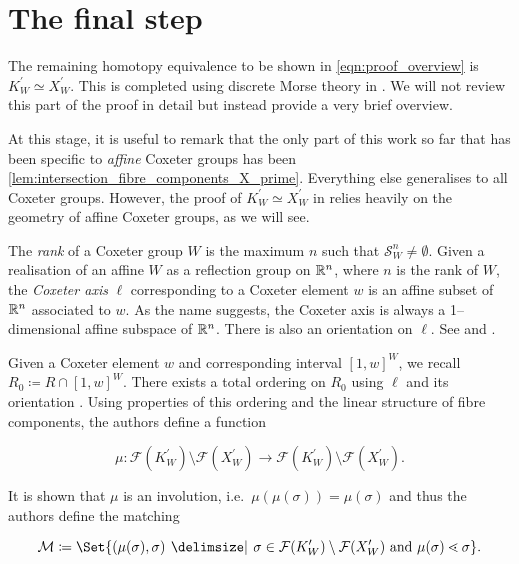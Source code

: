 \documentclass[class=article, crop=false]{standalone}
\begin{document}
\section{The final step}
The remaining homotopy equivalence to be shown in \eqref{eqn:proof_overview} is $K^\prime_W \simeq X^\prime_W$. This is completed using discrete Morse theory in \cite[Section 8]{paolini_salvetti_kpi1_2021}. We will not review this part of the proof in detail but instead provide a very brief overview.

At this stage, it is useful to remark that the only part of this work so far that has been specific to \emph{affine} Coxeter groups has been \cref{lem:intersection_fibre_components_X_prime}. Everything else generalises to all Coxeter groups. However, the proof of $K_W^\prime \simeq X^\prime_W$ in \cite{paolini_salvetti_kpi1_2021} relies heavily on the geometry of affine Coxeter groups, as we will see.

The \emph{rank} of a Coxeter group $W$ is the maximum $n$ such that $\mathcal{S}^n_W \neq \emptyset$. Given a realisation of an affine $W$ as a reflection group on $\mathbb{R}^n$, where $n$ is the rank of $W$, the \emph{Coxeter axis} $\ell$ corresponding to a Coxeter element $w$ is an affine subset of $\mathbb{R}^n$ associated to $w$. As the name suggests, the Coxeter axis is always a 1--dimensional affine subspace of $\mathbb{R}^n$. There is also an orientation on $\ell$. See \cite[Section 4]{paolini_salvetti_kpi1_2021} and \cite[Section 7]{mccammond_dual_2015}.

Given a Coxeter element $w$ and corresponding interval $[1,w]^W$, we recall $R_0 \coloneq R \cap [1,w]^W$. There exists a total ordering on $R_0$ using $\ell$ and its orientation \cite[Definition 4.10]{paolini_salvetti_kpi1_2021}. Using properties of this ordering and the linear structure of fibre components, the authors define a function 

\begin{equation*}
    \mu \colon \mathcal{F}(K_W^\prime)\setminus\mathcal{F}(X_W^\prime) \to \mathcal{F}(K_W^\prime)\setminus\mathcal{F}(X_W^\prime) .
\end{equation*}

It is shown that $\mu$ is an involution, i.e.~$\mu(\mu(\sigma)) = \mu(\sigma)$ and thus the authors define the matching

\begin{equation*}
    \mathcal{M} \coloneq \Set{(\mu(\sigma), \sigma) \given \sigma \in \mathcal{F}(K_W^\prime)\setminus\mathcal{F}(X_W^\prime) \text{ and } \mu(\sigma) \lessdot \sigma}.
\end{equation*}
\end{document}
